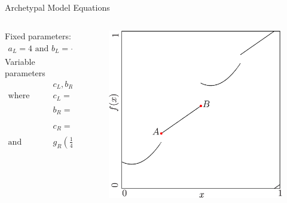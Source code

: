 \begin{frame}{Archetypal Model Equations}
	\vspace{-1em}
	\begin{columns}
		\begin{column}{.7 \textwidth}
			Fixed parameters:
			\begin{align*}
				a_L = 4 \text{ and } b_L = -\tfrac{1}{2}
			\end{align*}
			Variable parameters
			\begin{align*}
				 & c_L, b_R, c_R                                                                                                              \\
				\text{where} \qquad
				 & c_L = \beta,                                                                                                               \\
				 & b_R = -4 \cdot g_R\left(\tfrac{1}{4}\right) + 4 \cdot g_R\left(\tfrac{1}{2}\right),                                        \\
				 & c_R = 2 \cdot g_R\left(\tfrac{1}{4}\right) - 1 \cdot g_R\left(\tfrac{1}{2}\right),                                         \\[1em]
				\text{and} \qquad
				 & g_R\left(\tfrac{1}{4}\right) = \alpha, \text{and } g_R\left(\tfrac{1}{2}\right) = \tfrac{1}{2} + \epsilon \text{ is fixed}
			\end{align*}
		\end{column}
		\begin{column}{.3 \textwidth}
			\begin{figure}
				\centering
				\includegraphics[height=.5 \textheight]{Figs/archetypal_model_parameter_effects_illustration.png}
			\end{figure}
		\end{column}
	\end{columns}
\end{frame}

